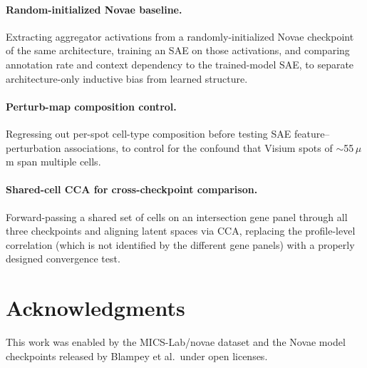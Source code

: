 \documentclass[11pt]{article}
\begin{document}
\paragraph{Random-initialized Novae baseline.}
Extracting aggregator activations from a randomly-initialized Novae
checkpoint of the same architecture, training an SAE on those
activations, and comparing annotation rate and context dependency to
the trained-model SAE, to separate architecture-only inductive bias
from learned structure.

\paragraph{Perturb-map composition control.}
Regressing out per-spot cell-type composition before testing SAE
feature--perturbation associations, to control for the confound that
Visium spots of $\sim$55\,$\mu$m span multiple cells.

\paragraph{Shared-cell CCA for cross-checkpoint comparison.}
Forward-passing a shared set of cells on an intersection gene panel
through all three checkpoints and aligning latent spaces via CCA,
replacing the profile-level correlation (which is not identified by
the different gene panels) with a properly designed convergence test.

\section*{Acknowledgments}

This work was enabled by the MICS-Lab/novae dataset and the Novae model
checkpoints released by Blampey et al.\ under open licenses.
\end{document}
